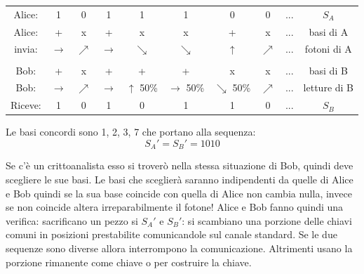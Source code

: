 \begin{table}[ht!]
    \centering
    \begin{tabular}{c|c c c c c c c c | c}
        Alice: & 1 & 0 & 1 & 1 & 1 & 0 & 0 & ... & $S_A$ \\
        Alice: & + & x & + & x & x & + & x & ... & basi di A \\
        invia: & $\rightarrow$ & $\nearrow$ & $\rightarrow$ & $\searrow$ & $\searrow$ & $\uparrow$ & $\nearrow$ & ... & fotoni di A \\
    
        & & & & & & & & & \\

        Bob: & + & x & + & + & + & x & x & ... & basi di B \\
        Bob: & $\rightarrow$ & $\nearrow$ & $\rightarrow$ & $\uparrow$ 50\% & $\rightarrow$ 50\% & $\searrow$ 50\% & $\nearrow$ & ... & letture di B \\
        Riceve: & 1 & 0 & 1 & 0 & 1 & 1 & 0 & ... & $S_B$ \\
    \end{tabular}
\end{table}

Le basi concordi sono 1, 2, 3, 7 che portano alla sequenza:
$$ S_A' = S_B' = 1010 $$

Se c'è un crittoanalista esso si troverò nella stessa situazione di Bob, quindi deve scegliere le sue basi.
Le basi che sceglierà saranno indipendenti da quelle di Alice e Bob quindi se la sua base coincide con quella di Alice non cambia nulla, invece se non coincide altera irreparabilmente il fotone!
Alice e Bob fanno quindi una verifica: sacrificano un pezzo si $S_A'$ e $S_B'$:
si scambiano una porzione delle chiavi comuni in posizioni prestabilite comunicandole sul canale standard.
Se le due sequenze sono diverse allora interrompono la comunicazione.
Altrimenti usano la porzione rimanente come chiave o per costruire la chiave.


